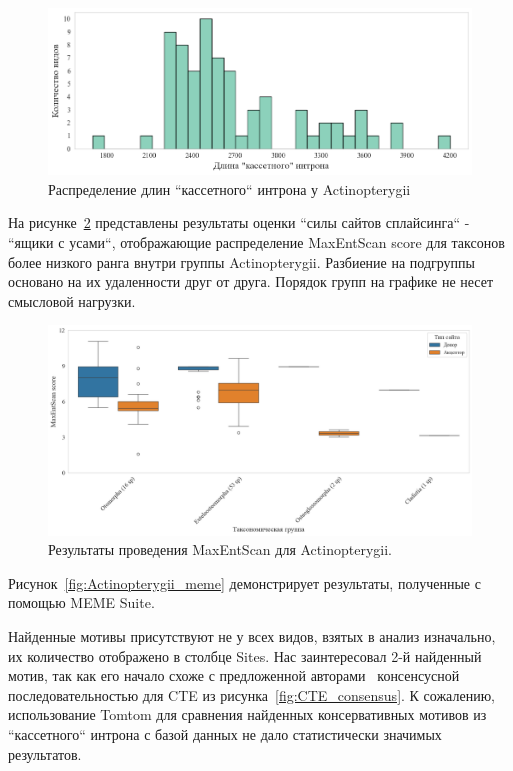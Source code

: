 \begin{figure}[h] %
    \centering
    \includegraphics[width=1.0\textwidth]{images/Actinopterygii_intron}
    \caption{Распределение длин ``кассетного`` интрона у Actinopterygii}
    \label{fig:Actinopterygii_intron}
\end{figure}


На рисунке~\ref{fig:Actinopterygii_maxentscan} представлены результаты оценки ``силы сайтов сплайсинга`` - ``ящики с усами``, отображающие распределение MaxEntScan score для таксонов более низкого ранга внутри группы Actinopterygii.
Разбиение на подгруппы основано на их удаленности друг от друга.
Порядок групп на графике не несет смысловой нагрузки.

\begin{figure}[h] %
    \centering
    \includegraphics[width=1.0\textwidth]{images/Actinopterygii_maxentscan}
    \caption{Результаты проведения MaxEntScan для Actinopterygii.}
    \label{fig:Actinopterygii_maxentscan}
\end{figure}


Рисунок~\ref{fig:Actinopterygii_meme} демонстрирует результаты, полученные с помощью MEME Suite.

Найденные мотивы присутствуют не у всех видов, взятых в анализ изначально, их количество отображено в столбце Sites.
Нас заинтересовал 2-й найденный мотив, так как его начало схоже с предложенной авторами~\cite{cte_consensus} консенсусной последовательностью для CTE из рисунка~\ref{fig:CTE_consensus}.
К сожалению, использование Tomtom для сравнения найденных консервативных мотивов из ``кассетного`` интрона с базой данных не дало статистически значимых результатов.

